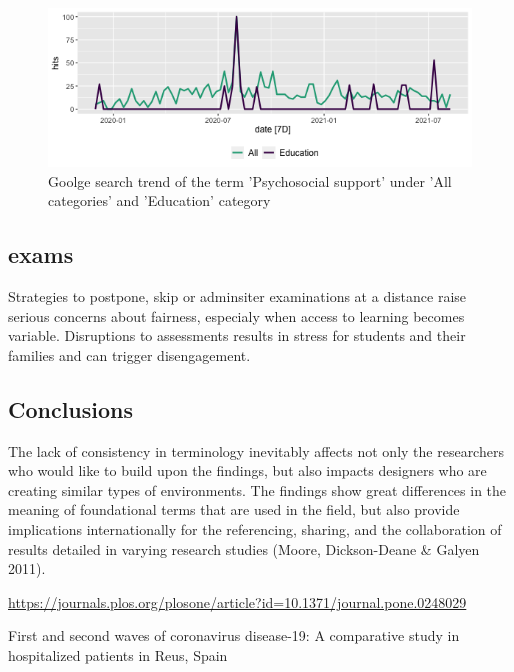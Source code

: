 \documentclass[11pt,a4paper,]{article}
\begin{document}
\begin{figure}[h]

{\centering \includegraphics[width=1\textwidth]{figure/psychosocialSupportAnalysis-1} 

}

\caption{Goolge search trend of the term 'Psychosocial support' under 'All categories' and 'Education' category}\label{fig:psychosocialSupportAnalysis}
\end{figure}

\hypertarget{exams}{%
\subsection{exams}\label{exams}}

Strategies to postpone, skip or adminsiter examinations at a distance raise serious concerns about fairness, especialy when access to learning becomes variable. Disruptions to assessments results in stress for students and their families and can trigger disengagement. \autocite{unesco2020covid,unescoadverse2020}

\hypertarget{conclusions}{%
\subsection{Conclusions}\label{conclusions}}

The lack of consistency in terminology inevitably affects not only the researchers who would like to build upon the findings, but also impacts designers who are creating similar types of environments. The findings show great differences in the meaning of foundational terms that are used in the field, but also provide implications internationally for the referencing, sharing, and the collaboration of results detailed in varying research studies (Moore, Dickson-Deane \& Galyen 2011).

\url{https://journals.plos.org/plosone/article?id=10.1371/journal.pone.0248029}

First and second waves of coronavirus disease-19: A comparative study in hospitalized patients in Reus, Spain

\printbibliography
\end{document}
